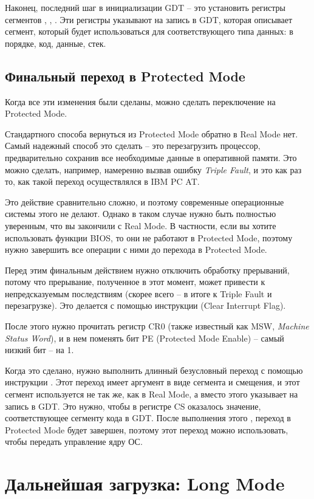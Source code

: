 \documentclass[a4page]{article}
\begin{document}
Наконец, последний шаг в инициализации GDT -- это установить регистры сегментов , , .
Эти регистры указывают на запись в GDT, которая описывает сегмент, который будет использоваться для соответствующего типа данных:
в порядке, код, данные, стек.

\subsection{Финальный переход в Protected Mode}

Когда все эти изменения были сделаны, можно сделать переключение на Protected Mode.

Стандартного способа вернуться из Protected Mode обратно в Real Mode нет.
Самый надежный способ это сделать -- это перезагрузить процессор,
предварительно сохранив все необходимые данные в оперативной памяти.
Это можно сделать, например, намеренно вызвав ошибку \emph{Triple Fault},
и это как раз то, как такой переход осуществлялся в IBM PC AT.

Это действие сравнительно сложно, и поэтому современные операционные системы этого не делают.
Однако в таком случае нужно быть полностью уверенным, что вы закончили с Real Mode.
В частности, если вы хотите использовать функции BIOS, то они не работают в Protected Mode,
поэтому нужно завершить все операции с ними до перехода в Protected Mode.

Перед этим финальным действием нужно отключить обработку прерываний, потому что прерывание, полученное в этот момент,
может привести к непредсказуемым последствиям (скорее всего -- в итоге к Triple Fault и перезагрузке).
Это делается с помощью инструкции  (Clear Interrupt Flag).

После этого нужно прочитать регистр CR0 (также известный как MSW, \emph{Machine Status Word}),
и в нем поменять бит PE (Protected Mode Enable) -- самый низкий бит -- на 1.

Когда это сделано, нужно выполнить длинный безусловный переход с помощью инструкции .
Этот переход имеет аргумент в виде сегмента и смещения, и
этот сегмент используется не так же, как в Real Mode, а вместо этого указывает на запись в GDT.
Это нужно, чтобы в регистре CS оказалось значение, соответствующее сегменту кода в GDT.
После выполнения этого , переход в Protected Mode будет завершен,
поэтому этот переход можно использовать, чтобы передать управление ядру ОС.

\section{Дальнейшая загрузка: Long Mode}
\end{document}

